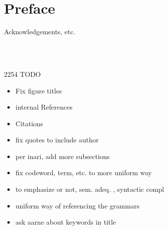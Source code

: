 \documentclass[11pt, a4paper]{article}
\begin{document}
\section*{Preface}

Acknowledgements, etc.

\thispagestyle{empty}

\newpage

\begin{spacing}{0.0}
\tableofcontents
\end{spacing}

\thispagestyle{empty}

\newpage
\setcounter{page}{1}

\begin{code}[hide]%
\>[0]\AgdaSymbol{\{-\#}\AgdaSpace{}%
\AgdaSpace{}%
\AgdaSpace{}%
\AgdaSymbol{\#-\}}\<%
\\
%
\\[\AgdaEmptyExtraSkip]%
\>[0]\AgdaSpace{}%
\AgdaSpace{}%
\<%
\end{code}

2254
TODO
\begin{itemize}
\item  Fix figure titles
\item internal References
\item Citations
\item fix quotes to include author
\item per inari, add more subsections
\item fix codeword, term, etc. to more uniform way
\item to emphasize or not, sem. adeq. , syntactic compl
\item uniform way of referencing the grammars
\item ask aarne about keywords in title
\end{itemize}

















% 




\newpage




\newpage


\end{document}
